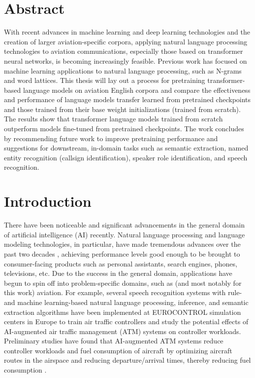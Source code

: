 \documentclass[12pt]{article}
\begin{document}
\section{Abstract}\label{sec:abstract}
With recent advances in machine learning and deep learning technologies and the creation of larger aviation-specific corpora, applying
natural language processing technologies to aviation communications, especially those based on transformer neural networks, is becoming
increasingly feasible. Previous work has focused on machine learning applications to natural language processing, such as N-grams and
word lattices. This thesis will lay out a process for pretraining transformer-based language models on aviation English corpora and
compare the effectiveness and performance of language models transfer learned from pretrained checkpoints and those trained from their
base weight initializations (trained from scratch). The results show that transformer language models trained from scratch outperform
models fine-tuned from pretrained checkpoints. The work concludes by recommending future work to improve pretraining performance and
suggestions for downstream, in-domain tasks such as semantic extraction, named entity recognition (callsign identification), speaker
role identification, and speech recognition.

\section{Introduction}\label{sec:introduction}
There have been noticeable and significant advancements in the general domain of artificial intelligence (AI) recently. Natural
language processing and language modeling technologies, in particular, have made tremendous advances over the past two decades
\cite{hannun_deep_2014,lee_unsupervised_2009,li_jasper_2019,kriman_quartznet_2020}, achieving performance levels good enough to be brought to
consumer-facing products such as personal assistants, search engines, phones, televisions, etc. Due to the success in the general domain, applications
have begun to spin off into problem-specific domains, such as (and most notably for this work) aviation. For example, several speech recognition
systems with rule- and machine learning-based natural language processing, inference, and semantic extraction algorithms have been implemented at
EUROCONTROL simulation centers in Europe to train air traffic controllers and study the potential effects of AI-augmented air traffic management (ATM)
systems on controller workloads. Preliminary studies have found that AI-augmented ATM systems reduce controller workloads and fuel consumption of
aircraft by optimizing aircraft routes in the airspace and reducing departure/arrival times, thereby reducing fuel consumption
\cite{helmke_quantifying_2017}.
\end{document}
